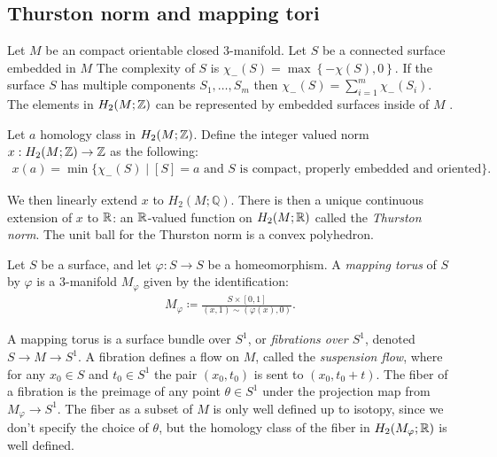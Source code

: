 \subsection{Thurston norm and mapping tori}
\label{sec:backgr-thurst-norm}

Let $M$ be an compact orientable closed $3$-manifold.
Let $S$ be a connected surface embedded in $M$  The complexity of $S$ is $\chi_-(S) = \max\left\{-\chi(S),0\right\}$.
If the surface $S$ has multiple components $S_1, \ldots, S_m$ then $\chi_-(S) = \displaystyle\sum_{i=1}^m\chi_-(S_i)$.
The elements in $H_2(M ; \mathbb{Z})$ can be represented by embedded surfaces inside of $M$ \cite[Lemma 1]{thurston1986norm}.


 Let $a$ homology class in $H_2(M; \mathbb{Z})$.  Define the integer valued norm $x:H_2(M;\mathbb{Z})\rightarrow \mathbb{Z}$ as the following:
\begin{align*}
  x(a) = \min\{\chi_-(S) \mid [S] = a \text{ and $S$ is compact, properly embedded and oriented}\}.
\end{align*}

We then linearly extend $x$ to $H_2(M;\mathbb{Q})$.
There is then a unique continuous extension of $x$ to $\mathbb{R}$: an $\mathbb{R}$-valued function on $H_2(M; \mathbb{R})$ called the \emph{Thurston norm}.
The unit ball for the Thurston norm is a convex polyhedron.%

 Let $S$ be a surface, and let $\varphi: S \to S$ be a homeomorphism.  A {\it mapping torus} of $S$ by $\varphi$ is a $3$-manifold $M_\varphi$ given by the identification:
\begin{align*}
  M_\varphi \coloneqq \frac{S \times [0,1]}{(x,1) \sim (\varphi(x), 0)}.
\end{align*}

A mapping torus is a surface bundle over $S^1$, or \emph{fibrations over $S^1$}, denoted $S\rightarrow M\rightarrow S^1$.
A fibration defines a flow on $M$, called the \emph{suspension flow}, where for any $x_0\in S$ and $t_0\in S^1$ the pair $(x_0,t_0)$ is sent to $(x_0,t_0+t)$.
The fiber of a fibration is the preimage of any point $\theta \in S^1$ under the projection map from $M_{\varphi} \to S^1$.
The fiber as a subset of $M$ is only well defined up to isotopy, since we don't specify the choice of $\theta$, but the homology class of the fiber in $H_2(M_{\varphi}; \mathbb{R})$ is well defined.

